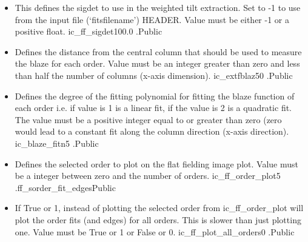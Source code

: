 \begin{itemize}
\item {}
{This defines the sigdet to use in the weighted tilt extraction. Set to -1 to use from the input file (`fitsfilename') HEADER. Value must be either -1 or a positive float.}
{ic\_ff\_sigdet}{100.0}
{\calFFraw}{\constantsfile}{\calFFraw.\progMAIN}{Public}


\item {}
{Defines the distance from the central column that should be used to measure the blaze for each order. Value must be an integer greater than zero and less than half the number of columns (x-axis dimension).}
{ic\_extfblaz}{50}
{\calFFraw}{\constantsfile}{\calFFraw.\progMAIN}{Public}


\item {}
{Defines the degree of the fitting polynomial for fitting the blaze function of each order i.e. if value is 1 is a linear fit, if the value is 2 is a quadratic fit. The value must be a positive integer equal to or greater than zero (zero would lead to a constant fit along the column direction (x-axis direction).}
{ic\_blaze\_fitn}{5}
{\calFFraw}{\constantsfile}{\calFFraw.\progMAIN}{Public}


\item {}
{Defines the selected order to plot on the flat fielding image plot. Value must be a integer between zero and the number of orders.}
{ic\_ff\_order\_plot}{5}
{\calFFraw}{\constantsfile}{\spirouPlot.ff\_sorder\_fit\_edges}{Public}

\item {}
{If True or 1, instead of plotting the selected order from ic\_ff\_order\_plot will plot the order fits (and edges) for all orders. This is slower than just plotting one. Value must be True or 1 or False or 0.}
{ic\_ff\_plot\_all\_orders}{0}
{\calFFraw}{\constantsfile}{\calFFraw.\progMAIN}{Public}

\end{itemize}








